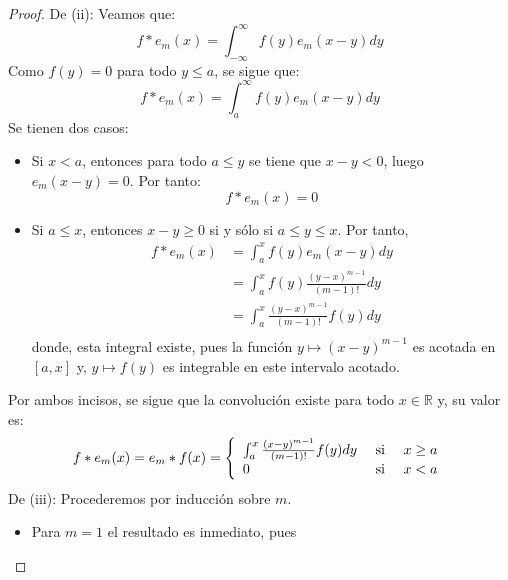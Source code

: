 \documentclass[12pt]{report}
\theoremstyle{largebreak}
\begin{document}
\begin{proof}
        De (ii): Veamos que:
        \begin{equation*}
            f*e_m(x)=\int_{-\infty}^{\infty}f(y)e_m(x-y)dy
        \end{equation*}
        Como $f(y)=0$ para todo $y\leq a$, se sigue que:
        \begin{equation*}
            f*e_m(x)=\int_{a}^{\infty}f(y)e_m(x-y)dy
        \end{equation*}
        Se tienen dos casos:
        \begin{itemize}
            \item Si $x<a$, entonces para todo $a\leq y$ se tiene que $x-y<0$, luego $e_m(x-y)=0$. Por tanto:
            \begin{equation*}
                f*e_m(x)=0
            \end{equation*}
            \item Si $a\leq x$, entonces $x-y\geq 0$ si y sólo si $a\leq y\leq x$. Por tanto,
            \begin{equation*}
                \begin{split}
                    f*e_m(x)&=\int_{a}^{x}f(y)e_m(x-y)dy\\
                    &=\int_{a}^{x}f(y)\frac{(y-x)^{m-1}}{(m-1)!}dy\\
                    &=\int_{a}^{x}\frac{(y-x)^{m-1}}{(m-1)!}f(y)dy\\
                \end{split}
            \end{equation*}
            donde, esta integral existe, pues la función $y\mapsto (x-y)^{m-1}$ es acotada en $[a,x]$ y, $y\mapsto f(y)$ es integrable en este intervalo acotado.
        \end{itemize}
        Por ambos incisos, se sigue que la convolución existe para todo $x\in\mathbb{R}$ y, su valor es:
        \begin{equation*}
            f*e_m(x)=e_m*f(x)=\left\{
                \begin{array}{lcr}
                    \int_{a}^x\frac{(x-y)^{m-1}}{(m-1)!}f(y)dy & \textup{ si } & x\geq a \\
                    0 & \textup{ si }&x<a\\
                \end{array}
            \right.
        \end{equation*}
        De (iii): Procederemos por inducción sobre $m$. 
        \begin{itemize}
            \item Para $m=1$ el resultado es inmediato, pues

\end{itemize}
\end{proof}
\end{document}
